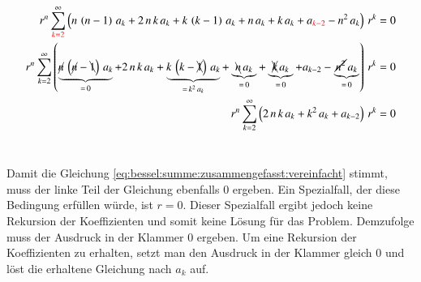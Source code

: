 \begin{align}
	r^n
	\sum_{\textcolor{red}{k=2}}^{\infty}
	\left(
	n \, \left( n - 1 \right) \, a_k 
	+
	2 \, n \, k \, a_k
	+
	k \, \left( k - 1 \right) \, a_k
	+
	n \, a_k
	+
	k \, a_k
	+
	a_{\textcolor{red}{k - 2}}
	-
	n^2 \, a_k
	\right)
	\, r^k
	= 0 
	\label{eq:bessel:summe:zusammengefasst}
	\\
	\nonumber
	r^n
	\sum_{k=2}^{\infty}
	\left(
	\underbrace{ \cancel{n} \, \left( \cancel{n} - \bcancel{1} \right) \, a_k }_{= \, 0}
	+
	2 \, n \, k \, a_k
	+
	\underbrace{k \, \left( k - \xcancel{1} \right) \, a_k}_{=\, k^2 \, a_k}
	+
	\underbrace{\bcancel{n} \, a_k}_{= \, 0}
	+
	\underbrace{\xcancel{k} \, a_k}_{= \, 0}
	+
	a_{k - 2}
	-
	\underbrace{\cancel{n^2} \, a_k}_{= \, 0}
	\right)
	\, r^k
	= 0 
	\\
	r^n
	\sum_{k=2}^{\infty}
	\left(
	2 \, n \, k \, a_k
	+
	k^2 \, a_k
	+
	a_{k - 2}
	\right)
	\, r^k
	= 0
	\label{eq:bessel:summe:zusammengefasst:vereinfacht}
\end{align}
\\
\begin{normalsize}
	Damit die Gleichung \ref{eq:bessel:summe:zusammengefasst:vereinfacht} stimmt,
	muss der linke Teil der Gleichung ebenfalls $0$ ergeben.
	Ein Spezialfall,
	der diese Bedingung erf\"ullen w\"urde,
	ist $r = 0$.
	Dieser Spezialfall ergibt jedoch keine Rekursion der Koeffizienten und somit keine L\"osung f\"ur das Problem.
	Demzufolge muss der Ausdruck in der Klammer $0$ ergeben.
	Um eine Rekursion der Koeffizienten zu erhalten,
	setzt man den Ausdruck in der Klammer gleich $0$ und l\"ost die erhaltene Gleichung nach $a_k$ auf.
\end{normalsize}

